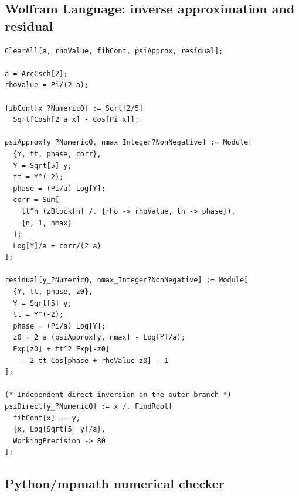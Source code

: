 \documentclass[11pt,oneside]{article}
\theoremstyle{plain}
\theoremstyle{definition}
\theoremstyle{remark}
\begin{document}
\subsection{Wolfram Language: inverse approximation and residual}

\begin{lstlisting}[style=wolframstyle,caption={Evaluating and certifying a truncation.}]
ClearAll[a, rhoValue, fibCont, psiApprox, residual];

a = ArcCsch[2];
rhoValue = Pi/(2 a);

fibCont[x_?NumericQ] := Sqrt[2/5]
  Sqrt[Cosh[2 a x] - Cos[Pi x]];

psiApprox[y_?NumericQ, nmax_Integer?NonNegative] := Module[
  {Y, tt, phase, corr},
  Y = Sqrt[5] y;
  tt = Y^(-2);
  phase = (Pi/a) Log[Y];
  corr = Sum[
    tt^n (zBlock[n] /. {rho -> rhoValue, th -> phase}),
    {n, 1, nmax}
  ];
  Log[Y]/a + corr/(2 a)
];

residual[y_?NumericQ, nmax_Integer?NonNegative] := Module[
  {Y, tt, phase, z0},
  Y = Sqrt[5] y;
  tt = Y^(-2);
  phase = (Pi/a) Log[Y];
  z0 = 2 a (psiApprox[y, nmax] - Log[Y]/a);
  Exp[z0] + tt^2 Exp[-z0]
    - 2 tt Cos[phase + rhoValue z0] - 1
];

(* Independent direct inversion on the outer branch *)
psiDirect[y_?NumericQ] := x /. FindRoot[
  fibCont[x] == y,
  {x, Log[Sqrt[5] y]/a},
  WorkingPrecision -> 80
];
\end{lstlisting}

\subsection{Python/mpmath numerical checker}
\end{document}

